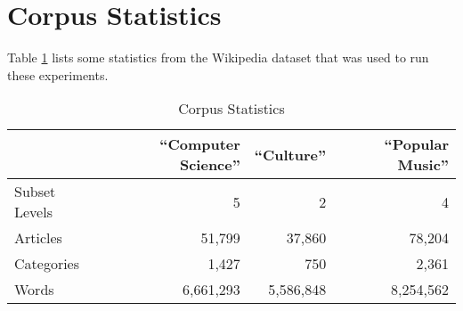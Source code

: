 \section{Corpus Statistics}
Table \ref{table:corpus-stats} lists some statistics from the Wikipedia dataset that was used to run these experiments.
\begin{table}
	\begin{center}
	\begin{spacing}{2.0}
		\begin{tabular}{lrrr}
			\hline
			& ``Computer Science'' & ``Culture'' & ``Popular Music''\\
			\hline
			Subset Levels & 5 & 2 & 4 \\
			Articles & 51,799 & 37,860 & 78,204 \\
			Categories & 1,427 & 750 & 2,361 \\
			Words & 6,661,293 & 5,586,848 & 8,254,562 \\
			\hline
		\end{tabular}
		\caption{Corpus Statistics}
		\label{table:corpus-stats}
	\end{spacing}
	\end{center}
\end{table}
